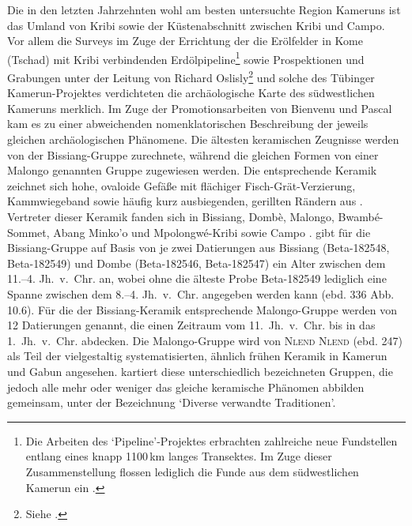 Die in den letzten Jahrzehnten wohl am besten untersuchte Region Kameruns ist das Umland von Kribi sowie der Küstenabschnitt zwischen Kribi und Campo. Vor allem die Surveys im Zuge der Errichtung der die Erölfelder in Kome (Tschad) mit Kribi verbindenden Erdölpipeline\footnote{Die Arbeiten des \enquote*{Pipeline}-Projektes erbrachten zahlreiche neue Fundstellen entlang eines knapp 1100\,km langes Transektes. Im Zuge dieser Zusammenstellung flossen lediglich die Funde aus dem südwestlichen Kamerun ein \parencites[siehe][]{Lavachery.2005}{Lavachery.2010}.} sowie Prospektionen und Grabungen unter der Leitung von Richard Oslisly\footnote{Siehe \textcites{Oslisly.2006}{Oslisly.2006d}.} und solche des Tübinger Kamerun-Projektes \parencites{Eggert.2006b}{Meister.2008b} verdichteten die archäologische Karte des südwestlichen Kameruns merklich. Im Zuge der Promotionsarbeiten von Bienvenu \textcite{GouemGouem.20102011} und Pascal \textcite{NlendNlend.20132014} kam es zu einer abweichenden nomenklatorischen Beschreibung der jeweils gleichen archäologischen Phänomene. Die ältesten keramischen Zeugnisse werden von \textcite[330ff.]{GouemGouem.20102011} der Bissiang-Gruppe zurechnete, während die gleichen Formen von \textcite[233--249]{NlendNlend.20132014} einer Malongo genannten Gruppe zugewiesen werden. Die entsprechende Keramik zeichnet sich hohe, ovaloide Gefäße mit flächiger Fisch-Grät-Verzierung, Kammwiegeband sowie häufig kurz ausbiegenden, gerillten Rändern aus \parencites[337 Abb.~11.6]{GouemGouem.20102011}[237--239 Abb.~102--104]{NlendNlend.20132014}. Vertreter dieser Keramik fanden sich in Bissiang, Dombè, Malongo, Bwambé-Sommet, Abang Minko'o und Mpolongwé-Kribi sowie Campo \parencites[336, 339 Karte 1.6]{GouemGouem.20102011}[254]{NlendNlend.20132014}{Seidensticker.2010b}. \textcite[336 Abb. 10.6]{GouemGouem.20102011} gibt für die Bissiang-Gruppe auf Basis von je zwei Datierungen aus Bissiang (Beta-182548, Beta-182549) und Dombe (Beta-182546, Beta-182547) ein Alter zwischen dem 11.--4. Jh.~v.~Chr. an, wobei ohne die älteste Probe Beta-182549 lediglich eine Spanne zwischen dem 8.--4. Jh.~v.~Chr. angegeben werden kann (ebd. 336 Abb. 10.6). Für die der Bissiang-Keramik entsprechende Malongo-Gruppe werden von \textcite[255 Abb.~116]{NlendNlend.20132014} 12 Datierungen genannt, die einen Zeitraum vom 11.~Jh.~v.~Chr. bis in das 1.~Jh.~v.~Chr. abdecken. Die Malongo-Gruppe wird von \textsc{Nlend Nlend} (ebd. 247) als Teil der vielgestaltig systematisierten, ähnlich frühen Keramik in Kamerun und Gabun angesehen. \textcite[632 Abb.~43.3]{deMaret.2013} kartiert diese unterschiedlich bezeichneten Gruppen, die jedoch alle mehr oder weniger das gleiche keramische Phänomen abbilden gemeinsam, unter der Bezeichnung \enquote*{Diverse verwandte Traditionen}.

